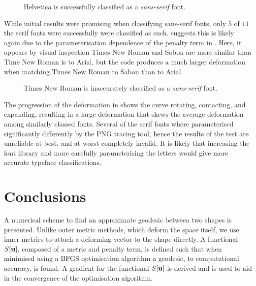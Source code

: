 \documentclass[a4paper, 12pt]{article}
\begin{document}
\begin{figure}[h!]
  \centering
  \caption[Successful typeface classification]{Helvetica is successfully classified as a \emph{sans-serif} font.}
  \label{fig:font_right}
\end{figure}

While initial results were promising when classifying sans-serif fonts, only $5$
of $11$ the serif fonts were successfully were classified as such. 
suggests this is likely again due to the parameterisation dependence of the
penalty term in . Here, it appears by visual inspection Times New Roman
and Sabon are more similar than Time New Roman is to Arial, but the code
produces a much larger deformation when matching Times New Roman to Sabon than
to Arial.

\begin{figure}[h!]
  \centering
\caption[Unsuccessful typeface classification]{Times New Roman is inaccurately classified as a \emph{sans-serif} font.}
  \label{fig:font_wrong}
\end{figure}

The progression of the deformation in  shows the curve rotating,
contacting, and expanding, resulting in a large deformation that skews the
average deformation among similarly classed fonts. Several of the serif fonts
where parameterised significantly differently by the PNG tracing tool, hence the
results of the test are unreliable at best, and at worst completely invalid. It is
likely that increasing the font library and more carefully parameterising the letters
would give more accurate typeface classifications.


\section{Conclusions\label{sec:conc}}

A numerical scheme to find an approximate geodesic between two shapes is
presented. Unlike outer metric methods, which deform the space itself, we use
inner metrics to attach a deforming vector to the shape directly. A functional
$S[\mathbf{u}]$, composed of a metric and penalty term, is defined such that when
minimised using a BFGS optimisation algorithm a geodesic, to computational
accuracy, is found. A gradient for the functional $S[\mathbf{u}]$ is derived
and is used to aid in the convergence of the optimisation algorithm.
\end{document}
